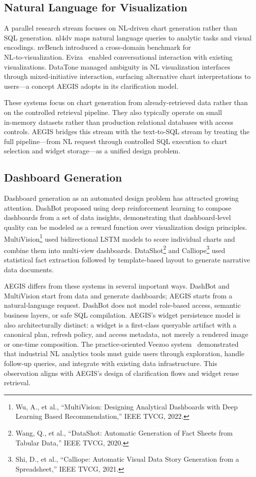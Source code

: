 \documentclass[11pt]{article}
\begin{document}
\subsection{Natural Language for Visualization}
A parallel research stream focuses on NL‑driven chart generation rather than SQL generation. nl4dv\cite{narechania2021nl4dv} maps natural language queries to analytic tasks and visual encodings. nvBench\cite{luo2021nvbench} introduced a cross‑domain benchmark for NL‑to‑visualization. Eviza~\cite{setlur2016eviza} enabled conversational interaction with existing visualizations. DataTone\cite{gao2015datatone} managed ambiguity in NL visualization interfaces through mixed‑initiative interaction, surfacing alternative chart interpretations to users—a concept AEGIS adopts in its clarification model.

These systems focus on chart generation from already‑retrieved data rather than on the controlled retrieval pipeline. They also typically operate on small in‑memory datasets rather than production relational databases with access controls. AEGIS bridges this stream with the text‑to‑SQL stream by treating the full pipeline—from NL request through controlled SQL execution to chart selection and widget storage—as a unified design problem.

\subsection{Dashboard Generation}
Dashboard generation as an automated design problem has attracted growing attention. DashBot\cite{deng2023dashbot} proposed using deep reinforcement learning to compose dashboards from a set of data insights, demonstrating that dashboard‑level quality can be modeled as a reward function over visualization design principles. MultiVision\footnote{Wu, A., et al., ``MultiVision: Designing Analytical Dashboards with Deep Learning Based Recommendation,'' IEEE TVCG, 2022.} used bidirectional LSTM models to score individual charts and combine them into multi‑view dashboards. DataShot\footnote{Wang, Q., et al., ``DataShot: Automatic Generation of Fact Sheets from Tabular Data,'' IEEE TVCG, 2020.} and Calliope\footnote{Shi, D., et al., ``Calliope: Automatic Visual Data Story Generation from a Spreadsheet,'' IEEE TVCG, 2021.} used statistical fact extraction followed by template‑based layout to generate narrative data documents.

AEGIS differs from these systems in several important ways. DashBot and MultiVision start from data and generate dashboards; AEGIS starts from a natural‑language request. DashBot does not model role‑based access, semantic business layers, or safe SQL compilation. AEGIS's widget persistence model is also architecturally distinct: a widget is a first‑class queryable artifact with a canonical plan, refresh policy, and access metadata, not merely a rendered image or one‑time composition. The practice‑oriented Veezoo system~\cite{lehmann2022building} demonstrated that industrial NL analytics tools must guide users through exploration, handle follow‑up queries, and integrate with existing data infrastructure. This observation aligns with AEGIS's design of clarification flows and widget reuse retrieval.
\end{document}
